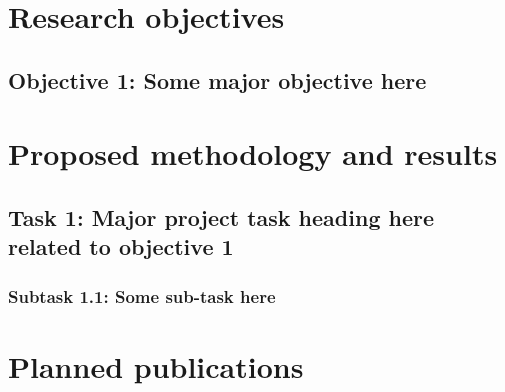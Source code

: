 \documentclass[12pt]{article}
\numberwithin{equation}{section}        %
\begin{document}

\section{Research objectives}                   %

\blindtext


\subsection*{Objective 1: Some major objective here}

\blindtext







\section{Proposed methodology and results}  %

\subsection{Task 1: Major project task heading here related to objective 1}

\blindtext




\subsubsection*{Subtask 1.1: Some sub-task here}
\blindtext






\section{Planned publications}
\end{document}
